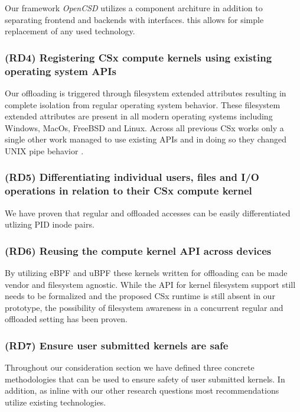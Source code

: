 Our framework \textit{OpenCSD} utilizes a component architure in addition to
separating frontend and backends with interfaces. this allows for simple
replacement of any used technology.

\subsubsection*{(RD4) Registering CSx compute kernels using existing operating
system APIs}

Our offloading is triggered through filesystem extended attributes
resulting in complete isolation from regular operating system behavior.
These filesystem extended attributes are present in all modern operating systems
including Windows, MacOs, FreeBSD and Linux. Across all previous CSx works only
a single other work managed to use existing APIs and in doing so they changed
UNIX pipe behavior \cite{10.1145/3342195.3387557}.

\subsubsection*{(RD5) Differentiating individual users, files and I/O operations in
relation to their CSx compute kernel}

We have proven that regular and offloaded accesses can be easily differentiated
utlizing PID inode pairs.

\subsubsection*{(RD6) Reusing the compute kernel API across devices}

By utilizing eBPF and uBPF these kernels written for offloading can be made
vendor and filesystem agnostic. While the API for kernel filesystem support
still needs to be formalized and the proposed CSx runtime is still absent in our
prototype, the possibility of filesystem awareness in a concurrent regular and
offloaded setting has been proven.

\subsubsection*{(RD7) Ensure user submitted kernels are safe}

Throughout our consideration section we have defined three concrete
methodologies that can be used to ensure safety of user submitted kernels.
In addition, as inline with our other research questions most recommendations
utilize existing technologies.

